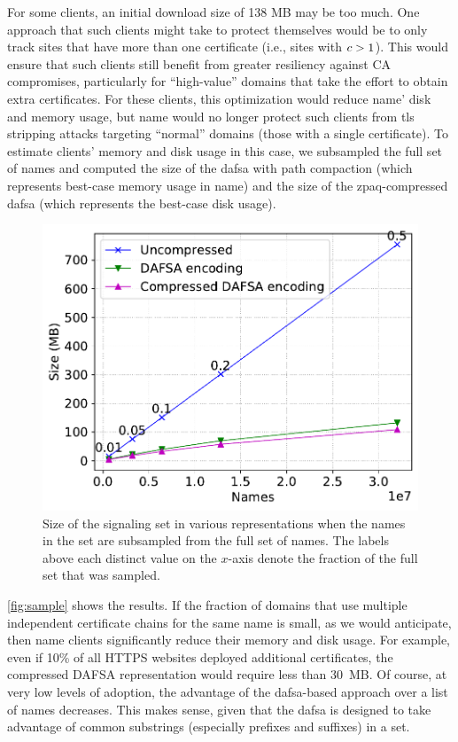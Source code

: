 For some clients, an initial download size of 138 MB may be too much. One
approach that such clients might take to protect themselves would be to only track
sites that have more than one certificate (i.e., sites with $c > 1$).
This would ensure that such clients still benefit from greater resiliency
against CA compromises, particularly for ``high-value'' domains that take the effort
to obtain extra certificates. 
For these clients, this optimization would reduce \ac{name}' disk and memory usage,
but \ac{name} would no longer protect such clients 
from \ac{tls} stripping attacks targeting
``normal'' domains (those with a single certificate).
To estimate clients' memory and disk usage in this case, we subsampled the full set of names
and computed the size of the \ac{dafsa} with path compaction (which represents
best-case memory usage in \ac{name}) and the size of the zpaq-compressed
\ac{dafsa} (which represents the best-case disk usage).

\begin{figure}[t]
  \centering
  \includegraphics[width=\linewidth]{fig/sample}
  \caption{Size of the signaling set in various representations when 
           the names in the set are subsampled from the full set of names. 
           The labels above each distinct value on the $x$-axis
           denote the fraction of the full set that was sampled.}
  \label{fig:sample}
\end{figure}

\autoref{fig:sample} shows the results. If the fraction of
domains that use multiple independent certificate chains for the same name is
small, as we would anticipate, then \ac{name} clients 
significantly reduce their memory and disk usage. 
For example, even if 10\% of all HTTPS websites deployed additional certificates,
the compressed DAFSA representation would require less than 30~MB.
Of course, at very low levels of adoption,
the advantage of the \ac{dafsa}-based
approach over a list of names decreases. This makes sense, given that the
\ac{dafsa} is designed to take advantage of common substrings (especially
prefixes and suffixes) in a set.


